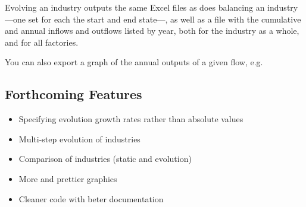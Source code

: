 \documentclass[a4paper,10pt,english]{sphinxmanual}
\begin{document}
Evolving an industry outputs the same Excel files as does balancing an industry —one set for each the start and end state—, as well as a file with the cumulative and annual inflows and outflows listed by year, both for the industry as a whole, and for all factories.

You can also export a graph of the annual outputs of a given flow, e.g.



\subsection{Forthcoming Features}
\label{\detokenize{intro:forthcoming-features}}\begin{itemize}
\item {} 
Specifying evolution growth rates rather than absolute values

\item {} 
Multi-step evolution of industries

\item {} 
Comparison of industries (static and evolution)

\item {} 
More and prettier graphics

\item {} 
Cleaner code with beter documentation

\end{itemize}
\end{document}
